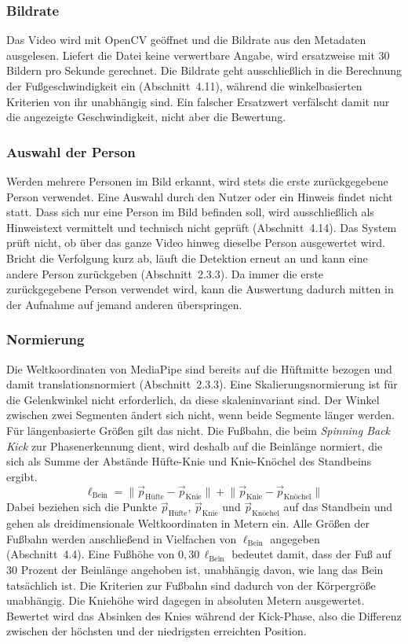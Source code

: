 \documentclass[intern]{cgMA}
\begin{document}
\subsubsection{Bildrate}
Das Video wird mit OpenCV geöffnet und die Bildrate aus den Metadaten ausgelesen. Liefert die Datei keine verwertbare Angabe, wird ersatzweise mit 30 Bildern pro Sekunde gerechnet. Die Bildrate geht ausschließlich in die Berechnung der Fußgeschwindigkeit ein (Abschnitt~4.11), während die winkelbasierten Kriterien von ihr unabhängig sind. Ein falscher Ersatzwert verfälscht damit nur die angezeigte Geschwindigkeit, nicht aber die Bewertung. 
\subsubsection{Auswahl der Person}
Werden mehrere Personen im Bild erkannt, wird stets die erste zurückgegebene Person verwendet. Eine Auswahl durch den Nutzer oder ein Hinweis findet nicht statt. Dass sich nur eine Person im Bild befinden soll, wird ausschließlich als Hinweistext vermittelt und technisch nicht geprüft (Abschnitt~4.14).
Das System prüft nicht, ob über das ganze Video hinweg dieselbe Person ausgewertet wird. Bricht die Verfolgung kurz ab, läuft die Detektion erneut an und kann eine andere Person zurückgeben (Abschnitt~2.3.3). Da immer die erste zurückgegebene Person verwendet wird, kann die Auswertung dadurch mitten in der Aufnahme auf jemand anderen überspringen.
\subsubsection{Normierung}
Die Weltkoordinaten von MediaPipe sind bereits auf die Hüftmitte bezogen und damit translationsnormiert (Abschnitt~2.3.3). Eine Skalierungsnormierung ist für die Gelenkwinkel nicht erforderlich, da diese skaleninvariant sind. Der Winkel zwischen zwei Segmenten ändert sich nicht, wenn beide Segmente länger werden.
Für längenbasierte Größen gilt das nicht. Die Fußbahn, die beim \textit{Spinning Back Kick} zur Phasenerkennung dient, wird deshalb auf die Beinlänge normiert, die sich als Summe der Abstände Hüfte-Knie und Knie-Knöchel des Standbeins ergibt. 
\begin{equation}
\ell_{\text{Bein}} = \lVert \vec{p}_{\text{Hüfte}} - \vec{p}_{\text{Knie}} \rVert + \lVert \vec{p}_{\text{Knie}} - \vec{p}_{\text{Knöchel}} \rVert
\label{eq:leglength}
\end{equation}
Dabei beziehen sich die Punkte $\vec{p}_{\text{Hüfte}}$, $\vec{p}_{\text{Knie}}$ und $\vec{p}_{\text{Knöchel}}$ auf das Standbein und gehen als dreidimensionale Weltkoordinaten in Metern ein. Alle Größen der Fußbahn werden anschließend in Vielfachen von $\ell_{\text{Bein}}$ angegeben (Abschnitt~4.4).  Eine Fußhöhe von $0{,}30\,\ell_{\text{Bein}}$ bedeutet damit, dass der Fuß auf 30 Prozent der Beinlänge angehoben ist, unabhängig davon, wie lang das Bein tatsächlich ist. Die Kriterien zur Fußbahn sind dadurch von der Körpergröße unabhängig.
Die Kniehöhe wird dagegen in absoluten Metern ausgewertet. Bewertet wird das Absinken des Knies während der Kick-Phase, also die Differenz zwischen der höchsten und der niedrigsten erreichten Position. 
\end{document}
